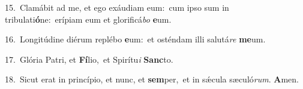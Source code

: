 {\numbfont\textcolor{\numbcolor}{15.}}~Clamábit ad me, et ego exáudiam eum:~\dagger cum ipso sum in tribulati\-\textbf{ó}\-ne:~\star erípiam eum et glorificá\textit{bo} \textbf{e}\-um.\par
{\numbfont\textcolor{\numbcolor}{16.}}~Longitúdine diérum replébo \textbf{e}\-um:~\star et osténdam illi salutá\textit{re} \textbf{me}\-um.\par
{\numbfont\textcolor{\numbcolor}{17.}}~Glória Patri, et \textbf{Fí}\-lio,~\star et Spirítu\textit{i} \textbf{Sanc}\-to.\par
{\numbfont\textcolor{\numbcolor}{18.}}~Sicut erat in princípio, et nunc, et \textbf{sem}\-per,~\star et in sǽcula sæculó\-\textit{rum}\-. \textbf{A}\-men.\par
